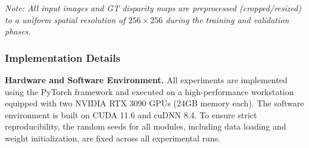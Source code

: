 \documentclass[lettersize,journal]{IEEEtran}
\begin{document}
\begin{table}[!t]
\centering
\caption{Summary of Datasets Used for Training and Evaluation}
\label{tab:datasets}
\renewcommand{\arraystretch}{1.3}
\end{table}

\textit{Note: All input images and GT disparity maps are preprocessed (cropped/resized) to a uniform spatial resolution of $256 \times 256$ during the training and validation phases.}

\subsubsection{Implementation Details}

\textbf{Hardware and Software Environment.} 
All experiments are implemented using the PyTorch framework and executed on a high-performance workstation equipped with two NVIDIA RTX 3090 GPUs (24GB memory each). The software environment is built on CUDA 11.6 and cuDNN 8.4. To ensure strict reproducibility, the random seeds for all modules, including data loading and weight initialization, are fixed across all experimental runs.
\end{document}
